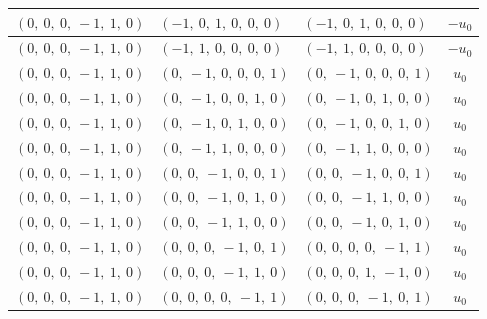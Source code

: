 \documentclass[11pt]{article}
\theoremstyle{definition}
\begin{document}
\begin{longtable}{|l|l|l|c|}
    \hline
    $\left( 0, \  0, \  0, \  -1, \  1, \  0\right)$ & $\left( -1, \  0, \  1, \  0, \  0, \  0\right)$ & $\left( -1, \  0, \  1, \  0, \  0, \  0\right)$ & $- u_{0}$ \\
    \hline
    $\left( 0, \  0, \  0, \  -1, \  1, \  0\right)$ & $\left( -1, \  1, \  0, \  0, \  0, \  0\right)$ & $\left( -1, \  1, \  0, \  0, \  0, \  0\right)$ & $- u_{0}$ \\
    \hline
    $\left( 0, \  0, \  0, \  -1, \  1, \  0\right)$ & $\left( 0, \  -1, \  0, \  0, \  0, \  1\right)$ & $\left( 0, \  -1, \  0, \  0, \  0, \  1\right)$ & $u_{0}$ \\
    \hline
    $\left( 0, \  0, \  0, \  -1, \  1, \  0\right)$ & $\left( 0, \  -1, \  0, \  0, \  1, \  0\right)$ & $\left( 0, \  -1, \  0, \  1, \  0, \  0\right)$ & $u_{0}$ \\
    \hline
    $\left( 0, \  0, \  0, \  -1, \  1, \  0\right)$ & $\left( 0, \  -1, \  0, \  1, \  0, \  0\right)$ & $\left( 0, \  -1, \  0, \  0, \  1, \  0\right)$ & $u_{0}$ \\
    \hline
    $\left( 0, \  0, \  0, \  -1, \  1, \  0\right)$ & $\left( 0, \  -1, \  1, \  0, \  0, \  0\right)$ & $\left( 0, \  -1, \  1, \  0, \  0, \  0\right)$ & $u_{0}$ \\
    \hline
    $\left( 0, \  0, \  0, \  -1, \  1, \  0\right)$ & $\left( 0, \  0, \  -1, \  0, \  0, \  1\right)$ & $\left( 0, \  0, \  -1, \  0, \  0, \  1\right)$ & $u_{0}$ \\
    \hline
    $\left( 0, \  0, \  0, \  -1, \  1, \  0\right)$ & $\left( 0, \  0, \  -1, \  0, \  1, \  0\right)$ & $\left( 0, \  0, \  -1, \  1, \  0, \  0\right)$ & $u_{0}$ \\
    \hline
    $\left( 0, \  0, \  0, \  -1, \  1, \  0\right)$ & $\left( 0, \  0, \  -1, \  1, \  0, \  0\right)$ & $\left( 0, \  0, \  -1, \  0, \  1, \  0\right)$ & $u_{0}$ \\
    \hline
    $\left( 0, \  0, \  0, \  -1, \  1, \  0\right)$ & $\left( 0, \  0, \  0, \  -1, \  0, \  1\right)$ & $\left( 0, \  0, \  0, \  0, \  -1, \  1\right)$ & $u_{0}$ \\
    \hline
    $\left( 0, \  0, \  0, \  -1, \  1, \  0\right)$ & $\left( 0, \  0, \  0, \  -1, \  1, \  0\right)$ & $\left( 0, \  0, \  0, \  1, \  -1, \  0\right)$ & $u_{0}$ \\
    \hline
    $\left( 0, \  0, \  0, \  -1, \  1, \  0\right)$ & $\left( 0, \  0, \  0, \  0, \  -1, \  1\right)$ & $\left( 0, \  0, \  0, \  -1, \  0, \  1\right)$ & $u_{0}$ \\

\end{longtable}
\end{document}
